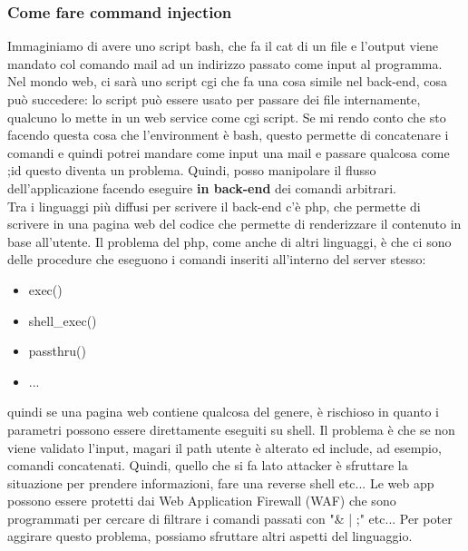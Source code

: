\documentclass{article}
\begin{document}
\subsubsection{Come fare command injection}
Immaginiamo di avere uno script bash, che fa il cat di un file e l'output viene mandato col comando mail ad un indirizzo passato come input al programma. Nel mondo web, ci sarà uno script cgi che fa una cosa simile nel back-end, cosa può succedere: lo script può essere usato per passare dei file internamente, qualcuno lo mette in un web service come cgi script. Se mi rendo conto che sto facendo questa cosa che l'environment è bash, questo permette di concatenare i comandi e quindi potrei mandare come input una mail e passare qualcosa come ;id questo diventa un problema. Quindi, posso manipolare il flusso dell'applicazione facendo eseguire \textbf{in back-end} dei comandi arbitrari.\\ Tra i linguaggi più diffusi per scrivere il back-end c'è php, che permette di scrivere in una pagina web del codice che permette di renderizzare il contenuto in base all'utente. Il problema del php, come anche di altri linguaggi, è che ci sono delle procedure che eseguono i comandi inseriti all'interno del server stesso:
\begin{itemize}
\item exec()
\item shell\_exec()
\item passthru()
\item ...
\end{itemize}
quindi se una pagina web contiene qualcosa del genere, è rischioso in quanto i parametri possono essere direttamente eseguiti su shell. Il problema è che se non viene validato l'input, magari il path utente è alterato ed include, ad esempio, comandi concatenati. Quindi, quello che si fa lato attacker è sfruttare la situazione per prendere informazioni, fare una reverse shell etc... Le web app possono essere protetti dai Web Application Firewall (WAF) che sono programmati per cercare di filtrare i comandi passati con "\& | ;" etc... Per poter aggirare questo problema, possiamo sfruttare altri aspetti del linguaggio.
\end{document}

